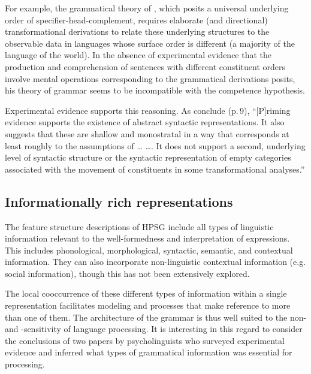 \documentclass[output=paper
	        ,collection
	        ,collectionchapter
 	        ,biblatex
                ,babelshorthands
                ,newtxmath
                ,draftmode
                ,colorlinks, citecolor=brown
]{langscibook}
\begin{document}
For example, the grammatical theory of \citet{Kayne94a-u}, which posits a universal underlying order of specifier-head-complement, requires elaborate (and directional) transformational derivations to
relate these underlying structures to the observable data in languages whose surface order is different (a majority of the language of the world).  In the absence of experimental evidence that
the production and comprehension of sentences with different constituent orders involve mental operations corresponding to the grammatical derivations \citeauthor{Kayne94a-u} posits, his theory of grammar seems to be incompatible with the competence hypothesis.

Experimental evidence supports this reasoning.  As \citet{BraniganPickering2017} conclude (p.\,9), ``[P]riming evidence supports the existence of abstract syntactic representations. It also suggests
that these are shallow and monostratal in a way that corresponds at least roughly to the assumptions of \ldots{} \citet{ps2} \ldots{}. It does not support a second, underlying level of syntactic
structure or the syntactic representation of empty categories associated with the movement of constituents in some transformational analyses.''

\subsection{Informationally rich representations}

The feature structure descriptions of HPSG include all types of linguistic information relevant to the well-formedness and interpretation of expressions. This includes phonological, morphological, syntactic, semantic, and contextual information.  They can also incorporate non-linguistic contextual information (e.g. social information), though this has not been extensively explored.

The local cooccurrence of these different types of information within a single
representation facilitates modeling  and  processes that make
reference to more than one of them.  The architecture of the grammar is thus well suited to the
non- and -sensitivity of language processing.  It is interesting in
this regard to consider the conclusions of two papers by psycholinguists who surveyed experimental
evidence and inferred what types of grammatical information was essential for processing.
\end{document}
